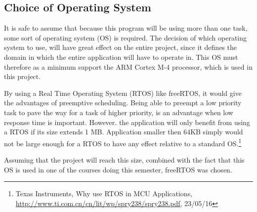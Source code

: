 \subsection{Choice of Operating System}
\label{sec:ChoiceofOperatingSystem}

It is safe to assume that because this program will be using more than one task, some sort of operating system (OS) is required. The decision of which operating system to use, will have great effect on the entire project, since it defines the domain in which the entire application will have to operate in. This OS must therefore as a minimum support the ARM Cortex M-4 processor, which is used in this project. 

By using a Real Time Operating System (RTOS) like freeRTOS, it would give the advantages of preemptive scheduling. Being able to preempt a low priority task to pave the way for a task of higher priority, is an advantage when low response time is important. However. the application will only benefit from using a RTOS if its size extends 1 MB. Application smaller then 64KB simply would not be large enough for a RTOS to have any effect relative to a standard OS.\footnote{Texas Instruments, Why use RTOS in MCU Applications, \url{http://www.ti.com.cn/cn/lit/wp/spry238/spry238.pdf}, 23/05/16}

Assuming that the project will reach this size, combined with the fact that this OS is used in one of the courses doing this semester, freeRTOS was chosen.